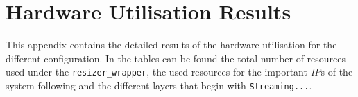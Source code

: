 
\chapter{Hardware Utilisation Results} %

\label{AppendixA} %


This appendix contains the detailed results of the hardware utilisation for the different configuration. In the tables can be found the total number of resources used under the \texttt{resizer\_wrapper}, the used resources for the important \emph{IP}s of the system following and the different layers that begin with \texttt{Streaming...}.




